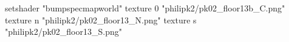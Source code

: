 setshader "bumpspecmapworld"
    texture 0 "philipk2/pk02_floor13b_C.png"
    texture n "philipk2/pk02_floor13_N.png"
    texture s "philipk2/pk02_floor13_S.png"